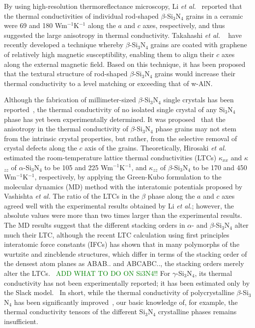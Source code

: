\documentclass[twocolumn,amsmath,amssymb,a4paper,prb,superscriptaddress,floatfix]{revtex4-1}
\begin{document}
By using high-resolution thermoreflectance microscopy, Li {\it et
al.}~\cite{li} reported that the thermal conductivities of individual
rod-shaped $\beta$-Si$_3$N$_4$ grains in a ceramic were 69 and 180
Wm$^{-1}$K$^{-1}$ along the $a$ and $c$ axes, respectively, and thus suggested
the large anisotropy in thermal conductivity.  Takahashi {\it et al.}
~\cite{takahashi} have recently developed a technique whereby
$\beta$-Si$_3$N$_4$ grains are coated with graphene of relatively high magnetic
susceptibility, enabling them to align their $c$ axes along the external
magnetic field.  Based on this technique, it has been proposed that the
textural structure of rod-shaped $\beta$-Si$_3$N$_4$ grains would increase
their thermal conductivity to a level matching or exceeding that of w-AlN.

Although the fabrication of millimeter-sized $\beta$-Si$_3$N$_4$ single
crystals has been reported~\cite{yamamoto}, the thermal conductivity of no
isolated single crystal of any Si$_3$N$_4$ phase has yet been experimentally
determined.  It was proposed~\cite{watari-trans} that the anisotropy in the
thermal conductivity of $\beta$-Si$_3$N$_4$ phase grains may not stem from the
intrinsic crystal properties, but rather, from the selective removal of crystal
defects along the $c$ axis of the grains.  Theoretically, Hirosaki {\it et
al.}~\cite{hirosaki-md} estimated the room-temperature lattice thermal
conductivities (LTCs) $\kappa$$_{xx}$ and $\kappa$$_{zz}$ of
$\alpha$-Si$_3$N$_4$ to be 105 and 225 Wm$^{-1}$K$^{-1}$, and $\kappa$$_{zz}$
of $\beta$-Si$_3$N$_4$ to be 170 and 450 Wm$^{-1}$K$^{-1}$, respectively, by
applying the Green-Kubo formulation to the molecular dynamics (MD) method with
the interatomic potentials proposed by Vashishta {\it et al.} The ratio of the
LTCs in the $\beta$ phase along the $a$ and $c$ axes agreed well with the
experimental results obtained by Li {\it et al.}; however, the absolute values
were more than two times larger than the experimental results.  The MD results
suggest that the different stacking orders in $\alpha$- and $\beta$-Si$_3$N$_4$
alter much their LTC, although the recent LTC calculation using first
principles interatomic force constants (IFCs) has shown that in many polymorphs of the wurtzite
and zincblende structures, which differ in terms of the stacking order of the
densest atom planes as ABAB.. and ABCABC.., the stacking orders merely alter
the LTCs.~\cite{phono3py} \textcolor{green}{ADD WHAT TO DO ON Si3N4!!} For $\gamma$-Si$_3$N$_4$, its thermal conductivity
has not been experimentally reported; it has been estimated only by the Slack
model.~\cite{morelli} In short, while the thermal conductivity of
polycrystalline $\beta$-Si$_3$N$_4$ has been significantly
improved~\cite{zhou,hirao,watari,hirosaki}, our basic knowledge of, for
example, the thermal conductivity tensors of the different Si$_3$N$_4$
crystalline phases remains insufficient.
\end{document}
